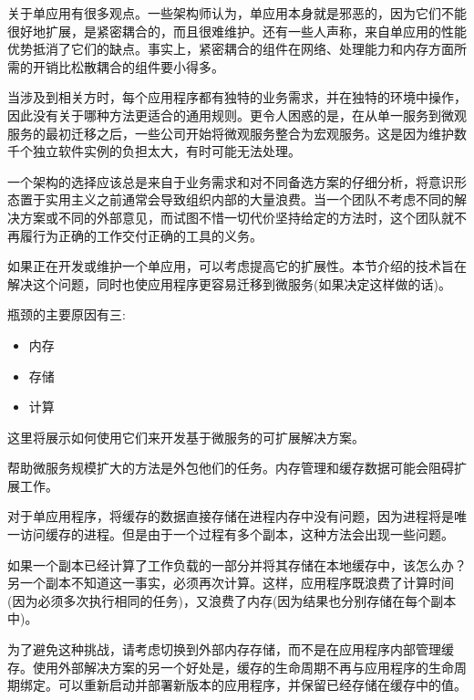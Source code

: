 

关于单应用有很多观点。一些架构师认为，单应用本身就是邪恶的，因为它们不能很好地扩展，是紧密耦合的，而且很难维护。还有一些人声称，来自单应用的性能优势抵消了它们的缺点。事实上，紧密耦合的组件在网络、处理能力和内存方面所需的开销比松散耦合的组件要小得多。

当涉及到相关方时，每个应用程序都有独特的业务需求，并在独特的环境中操作，因此没有关于哪种方法更适合的通用规则。更令人困惑的是，在从单一服务到微观服务的最初迁移之后，一些公司开始将微观服务整合为宏观服务。这是因为维护数千个独立软件实例的负担太大，有时可能无法处理。

一个架构的选择应该总是来自于业务需求和对不同备选方案的仔细分析，将意识形态置于实用主义之前通常会导致组织内部的大量浪费。当一个团队不考虑不同的解决方案或不同的外部意见，而试图不惜一切代价坚持给定的方法时，这个团队就不再履行为正确的工作交付正确的工具的义务。

如果正在开发或维护一个单应用，可以考虑提高它的扩展性。本节介绍的技术旨在解决这个问题，同时也使应用程序更容易迁移到微服务(如果决定这样做的话)。

瓶颈的主要原因有三:

\begin{itemize}
\item 
内存

\item 
存储

\item 
计算
\end{itemize}

这里将展示如何使用它们来开发基于微服务的可扩展解决方案。


帮助微服务规模扩大的方法是外包他们的任务。内存管理和缓存数据可能会阻碍扩展工作。

对于单应用程序，将缓存的数据直接存储在进程内存中没有问题，因为进程将是唯一访问缓存的进程。但是由于一个过程有多个副本，这种方法会出现一些问题。

如果一个副本已经计算了工作负载的一部分并将其存储在本地缓存中，该怎么办？另一个副本不知道这一事实，必须再次计算。这样，应用程序既浪费了计算时间(因为必须多次执行相同的任务)，又浪费了内存(因为结果也分别存储在每个副本中)。

为了避免这种挑战，请考虑切换到外部内存存储，而不是在应用程序内部管理缓存。使用外部解决方案的另一个好处是，缓存的生命周期不再与应用程序的生命周期绑定。可以重新启动并部署新版本的应用程序，并保留已经存储在缓存中的值。

